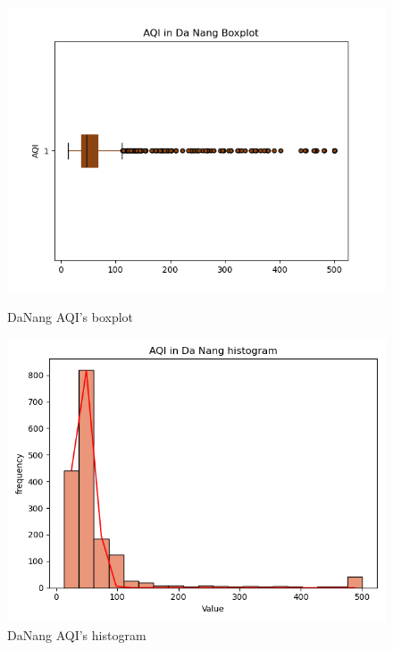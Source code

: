 \documentclass[conference]{IEEEtran}
\begin{document}
\begin{figure}[H]
    \centering
    \begin{minipage}{0.23\textwidth}
        \centering
        \includegraphics[width=1\textwidth]{bibliography/figure/Analysis-Dataset/BoxplotDaNang.png}
        \caption{DaNang AQI's boxplot}
        \label{fig:1}
    \end{minipage}
    \hfill
    \begin{minipage}{0.23\textwidth}
        \centering
        \includegraphics[width=1\textwidth]{bibliography/figure/Analysis-Dataset/histogramDaNang.png}
        \caption{DaNang AQI's histogram}
        \label{fig:2}
    \end{minipage}
\end{figure}
\end{document}
